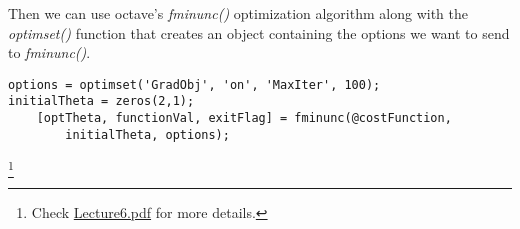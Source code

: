 \documentclass[a4paper, 12pt]{report}
\newcommand\blfootnote[1]{
	\begingroup
	\renewcommand\thefootnote{}\footnote{#1}
	\addtocounter{footnote}{-1}
	\endgroup
}
\begin{document}
Then we can use octave's \emph{fminunc()} optimization algorithm along with the
\emph{optimset()} function that creates an object containing the options we
want to send to \emph{fminunc()}.
\begin{verbatim}
options = optimset('GradObj', 'on', 'MaxIter', 100);
initialTheta = zeros(2,1);
	[optTheta, functionVal, exitFlag] = fminunc(@costFunction, 
		initialTheta, options);
\end{verbatim}


\blfootnote{Check \href{lecture_pdf/Lecture6.pdf}{Lecture6.pdf} for more details.}

\begin{appendices}
\end{appendices}
\end{document}
